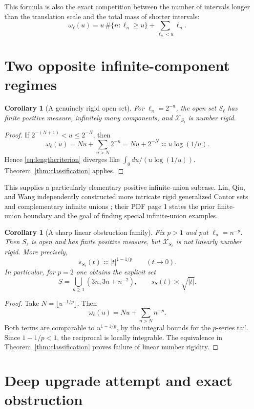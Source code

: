 \documentclass[11pt]{article}
\newtheorem{corollary}[theorem]{Corollary}
\newcommand{\D}{\mathcal X}
\begin{document}
This formula is also the exact competition between the number of intervals
longer than the translation scale and the total mass of shorter intervals:
\[
 \omega_\ell(u)=u\,\#\{n:\ell_n\geq u\}
 +\sum_{\ell_n<u}\ell_n.
\]

\section*{Two opposite infinite-component regimes}

\begin{corollary}[A genuinely rigid open set]\label{cor:exp}
For $\ell_n=2^{-n}$, the open set $S_\ell$ has finite positive measure,
infinitely many components, and $\D_{S_\ell}$ is number rigid.
\end{corollary}

\begin{proof}
If $2^{-(N+1)}<u\leq2^{-N}$, then
\[
 \omega_\ell(u)=Nu+\sum_{n>N}2^{-n}=Nu+2^{-N}
 \asymp u\log(1/u).
\]
Hence \eqref{eq:lengthcriterion} diverges like
$\int_0 du/(u\log(1/u))$.  Theorem~\ref{thm:classification} applies.
\end{proof}

This supplies a particularly elementary positive infinite-union subcase.
Lin, Qiu, and Wang independently constructed more intricate rigid generalized
Cantor sets and complementary infinite unions \cite{cantor}; their PDF page 1
states the prior finite-union boundary and the goal of finding special
infinite-union examples.

\begin{corollary}[A sharp linear obstruction family]\label{cor:poly}
Fix $p>1$ and put $\ell_n=n^{-p}$.  Then $S_\ell$ is open and has finite
positive measure, but $\D_{S_\ell}$ is not linearly number rigid.  More
precisely,
\[
 s_{S_\ell}(t)\asymp |t|^{1-1/p}\qquad(t\to0).
\]
In particular, for $p=2$ one obtains the explicit set
\[
 S=\bigcup_{n\geq1}(3n,3n+n^{-2}),
 \qquad s_S(t)\asymp\sqrt{|t|}.
\]
\end{corollary}

\begin{proof}
Take $N=\lfloor u^{-1/p}\rfloor$.  Then
\[
 \omega_\ell(u)=Nu+\sum_{n>N}n^{-p}.
\]
Both terms are comparable to $u^{1-1/p}$, by the integral bounds for the
$p$-series tail.  Since $1-1/p<1$, the reciprocal is locally integrable.
The equivalence in Theorem~\ref{thm:classification} proves failure of linear
number rigidity.
\end{proof}

\section*{Deep upgrade attempt and exact obstruction}
\end{document}
